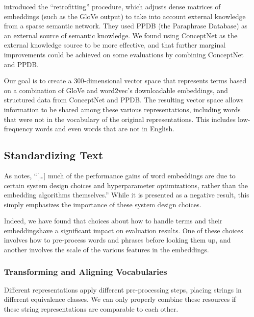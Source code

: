 \documentclass[11pt,letterpaper]{article}
\begin{document}
 introduced the ``retrofitting'' procedure,
which adjusts dense matrices of embeddings (such as the GloVe output) to take
into account external knowledge from a sparse semantic network. They used PPDB
\cite{ganitkevitch2013ppdb} (the Paraphrase Database) as an external source of
semantic knowledge. We found using ConceptNet as the external knowledge source
to be more effective, and that further marginal improvements could be achieved
on some evaluations by combining ConceptNet and PPDB.

Our goal is to create a 300-dimensional vector space that represents terms based
on a combination of GloVe and word2vec's downloadable embeddings, and structured
data from ConceptNet and PPDB. The resulting vector space allows information to
be shared among these various representations, including words that were not in
the vocabulary of the original representations. This includes low-frequency words
and even words that are not in English.

\subsection{Standardizing Text}

As  notes,
``[\ldots] much of the performance gains of word embeddings are due to certain
system design choices and hyperparameter optimizations, rather than the
embedding algorithms themselves.'' While it is presented as a negative result,
this simply emphasizes the importance of these system design choices.

Indeed, we have found that choices about how to handle terms and their
embeddingshave a significant impact on evaluation results. One of these choices
involves how to pre-process words and phrases before looking them up, and
another involves the scale of the various features in the embeddings.


\subsubsection{Transforming and Aligning Vocabularies}

Different representations apply
different pre-processing steps, placing strings in different equivalence
classes. We can only properly combine these resources if these string
representations are comparable to each other.
\end{document}
